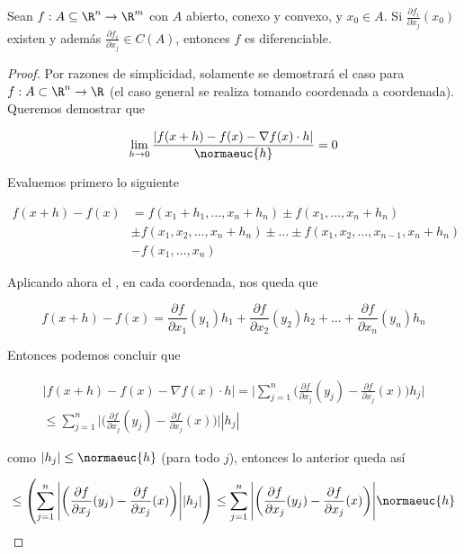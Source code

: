 \begin{teo}
    Sean $f: A \subseteq \R^n \rightarrow \R^m$ con $A$ abierto, conexo y convexo, y $x_0 \in A$. Si $\frac{\partial f_i}{\partial x_j}(x_0)$ existen y además $\frac{\partial f_i}{\partial x_j} \in C(A)$, entonces $f$ es diferenciable.
\end{teo}

\begin{proof}
    Por razones de simplicidad, solamente se demostrará el caso para $f: A \subset \R^n \rightarrow \R$ (el caso general se realiza tomando coordenada a coordenada). Queremos demostrar que
    
    \[
    \lim_{h \to 0} \frac{\left| f(x + h) - f(x) - \nabla f(x) \cdot h \right|}{\normaeuc{h}} = 0
    \]
    
    Evaluemos primero lo siguiente
    
    \begin{align*}
        f(x + h) - f(x) &= f(x_1 + h_1, \dots, x_n + h_n) \pm f(x_1, \dots, x_n + h_n) \\
            &\pm f(x_1, x_2, \dots, x_n + h_n) \pm \dots \pm f(x_1, x_2, \dots, x_{n-1}, x_n + h_n) \\
            &- f(x_1, \dots, x_n)
    \end{align*}
    
    Aplicando ahora el \TVM, en cada coordenada, nos queda que
    
    \[
    f(x + h) - f(x) = \frac{\partial f}{\partial x_1}(y_1)h_1 + \frac{\partial f}{\partial x_2}(y_2)h_2 + \dots + \frac{\partial f}{\partial x_n}(y_n)h_n
    \]
    
    Entonces podemos concluir que
    
    \begin{gather*}
        \big| f(x + h) - f(x) - \nabla f(x) \cdot h \big| = \Bigg| \sum_{j=1}^n \bigg( \frac{\partial f}{\partial x_j} (y_j) - \frac{\partial f}{\partial x_j} (x) \bigg) h_j \Bigg| \\
            \leq \sum_{j=1}^n \Bigg| \bigg( \frac{\partial f}{\partial x_j} (y_j) - \frac{\partial f}{\partial x_j} (x) \bigg) \Bigg| |h_j|
    \end{gather*}
    
    \noindent como $|h_j| \leq \normaeuc{h}$ (para todo $j$), entonces lo anterior queda así
    
    \begin{equation}\label{eq:2.1.1}
        \leq \left(\sum_{j=1}^n \Bigg| \bigg( \frac{\partial f}{\partial x_j} (y_j) - \frac{\partial f}{\partial x_j} (x) \bigg) \Bigg| |h_j|\right) \leq \sum_{j=1}^n \Bigg| \bigg( \frac{\partial f}{\partial x_j} (y_j) - \frac{\partial f}{\partial x_j} (x) \bigg) \Bigg| \normaeuc{h}
    \end{equation}
    

\end{proof}
